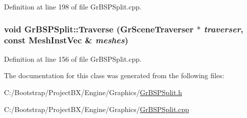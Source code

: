 Definition at line 198 of file GrBSPSplit.cpp.\hypertarget{class_gr_b_s_p_split_dad2ea9500a1bedb5736e6d248f3d802}{
\subsubsection[{Traverse}]{\setlength{\rightskip}{0pt plus 5cm}void GrBSPSplit::Traverse ({\bf GrSceneTraverser} $\ast$ {\em traverser}, \/  const {\bf MeshInstVec} \& {\em meshes})}}
\label{class_gr_b_s_p_split_dad2ea9500a1bedb5736e6d248f3d802}




Definition at line 156 of file GrBSPSplit.cpp.

The documentation for this class was generated from the following files:\begin{CompactItemize}
\item 
C:/Bootstrap/ProjectBX/Engine/Graphics/\hyperlink{_gr_b_s_p_split_8h}{GrBSPSplit.h}\item 
C:/Bootstrap/ProjectBX/Engine/Graphics/\hyperlink{_gr_b_s_p_split_8cpp}{GrBSPSplit.cpp}\end{CompactItemize}
